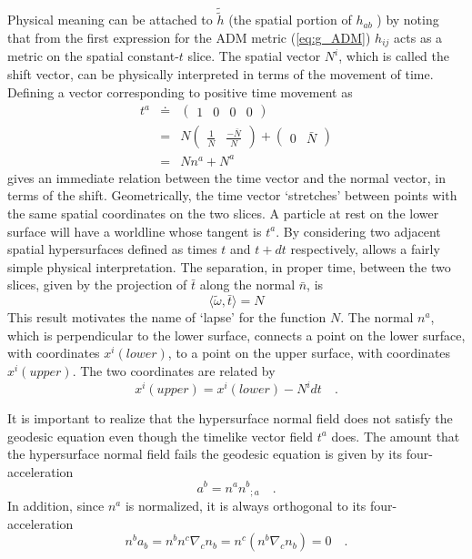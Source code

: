 \documentclass[twocolumn]{article}
\def\.{{\quad .}}
\begin{document}
Physical meaning can be attached to ${\tilde {\tilde h}}$ (the spatial portion
of $h_{ab}$ ) by noting that from the first expression for the ADM metric
(\ref{eq:g_ADM}) $h_{ij}$ acts as a metric on the spatial constant-$t$ slice.
The spatial vector $N^i$, which is called the shift vector, can be
physically interpreted in terms of the movement of time.  Defining a vector
corresponding to positive time movement as
\begin{eqnarray*}
  t^a & \doteq & \left( \begin{array}{cccc} 1 & 0 & 0 & 0 \end{array} \right) \\
      &   =    &  N \left( \begin{array}{cc}
                             \frac{1}{N} & \frac{-\bar N}{N}
                           \end{array}
                    \right) +
                    \left( \begin{array}{cc}
                             0 & \bar N
                           \end{array}
                    \right) \\
      &   =    & N n^a + N^a
\end{eqnarray*}
gives an immediate relation between the time vector and the normal vector, in
terms of the shift.
Geometrically, the time vector `stretches' between points with the same spatial
coordinates on the two slices.
A particle at rest on the lower surface will have a worldline whose tangent
is $t^a$.
By considering two adjacent spatial hypersurfaces defined
as times $t$ and $t+dt$ respectively, allows a fairly simple physical
interpretation.
The separation, in proper time, between the two slices, given by the projection
of $\bar t$ along the normal $\bar n$, is
\[
  \langle \tilde \omega , \bar t \rangle = N
\]
This result motivates the name of `lapse' for the function $N$.
The normal $n^a$, which is perpendicular to the lower surface, connects a
point on the lower surface, with coordinates $x^i(lower)$, to a point on
the upper surface, with coordinates $x^i(upper)$.
The two coordinates are related by
\[
   x^i(upper) = x^i(lower) - N^i dt \.
\]

It is important to realize that the hypersurface normal field does not satisfy
the geodesic equation even though the timelike vector field $t^a$ does.  The
amount that the hypersurface normal field fails the geodesic equation is given
by its four-acceleration
\[
   a^{b} = n^a {n^b}_{;a} \.
\]
In addition, since $n^a$ is normalized, it is always orthogonal to its four-
acceleration
\[
   n^b a_b = n^b n^c \nabla_c n_b= n^c \left( n^b \nabla_c n_b \right) = 0 \.
\]
\end{document}
